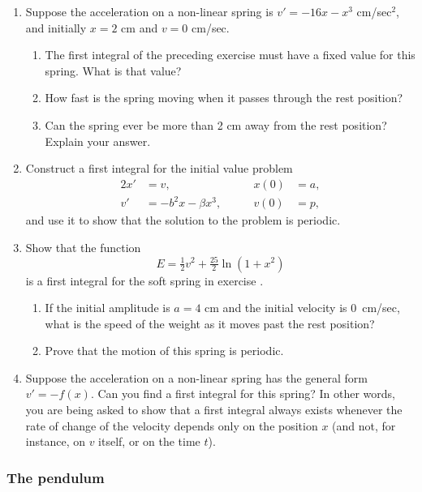 \begin{enumerate}
\item Suppose the acceleration on a non-linear spring is $v' = -16 x -
x^3$ cm/sec$^2$, and initially $x = 2$ cm and $v = 0$ cm/sec.

  \begin{enumerate}
  \item The first integral of the preceding exercise must have a fixed
value for this spring.  What is that value?

  \item How fast is the spring moving when it passes through the rest
position?

  \item Can the spring ever be more than 2 cm away from the rest
position?  Explain your answer.


\end{enumerate}
\item Construct a first integral for the initial value problem
\begin{alignat*}{2}
x' &= v,  		  &\qquad 	x(0) &= a, \\
v' &= -b^2 x - \beta x^3, &\qquad  	v(0) &= p,
\end{alignat*}
and use it to show that the solution to the problem is periodic.


\item \label{ln first int}  Show that the function
	\[
E = \tfrac{1}{2} v^2 + \tfrac{25}{2} \ln (1+x^2)
\]
is a first integral for the soft spring in exercise \thesoftexercise.

  \begin{enumerate}
  \item If the initial amplitude is $a = 4$ cm and the initial velocity
is 0~cm/sec, what is the speed of the weight as it moves past the rest
position?

  \item Prove that the motion of this spring is periodic.


\end{enumerate}
\item Suppose the acceleration on a non-linear spring has the general
form $v' = -f(x)$.  Can you find a first integral for this spring?  In
other words, you are being asked to show that a first integral always
exists whenever the rate of change of the velocity depends only on the
position $x$ (and not, for instance, on $v$ itself, or on the time
$t$).


\end{enumerate}
\subsubsection{The pendulum}
\label{subsubsec:the-pendulum}

